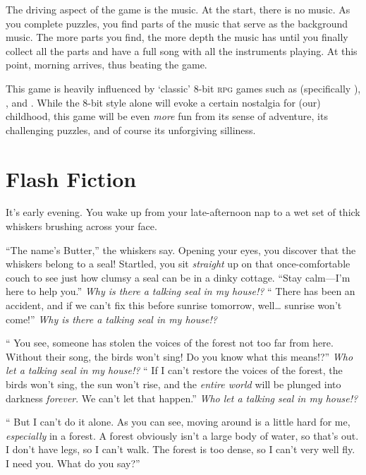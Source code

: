 \documentclass[letterpaper]{article}
\begin{document}
The driving aspect of the game is the music.
At the start, there is no music.
As you complete puzzles, you find parts of the music that serve as the background music.
The more parts you find, the more depth the music has until you finally collect all the parts and have a full song with all the instruments playing.
At this point, morning arrives, thus beating the game.

This game is heavily influenced by \enquote*{classic} 8-bit \textsc{rpg} games
  such as 
  (specifically ),
  , and
  .
While the 8-bit style alone will evoke a certain nostalgia for (our) childhood,
  this game will be even \emph{more} fun from its sense of adventure,
  its challenging puzzles, and of course
  its unforgiving silliness.

\section{Flash Fiction}
\label{sec:flash-fiction}

\def\thought{\textsl}

It's early evening.
You wake up from your late-afternoon nap to
  a wet set of thick whiskers
  brushing across your face.

\enquote{The name's Butter,} the whiskers say.
Opening your eyes, you discover that the whiskers belong to a seal!
Startled, you sit \emph{straight} up on that once-comfortable couch
  to see just how clumsy a seal can be in a dinky cottage.
\enquote{Stay calm---I'm here to help you.}
\thought{Why is there a talking seal in my house!?}
\enquote{%
  There has been an accident, and
  if we can't fix this before sunrise tomorrow, well\dots
  sunrise won't come!}
\thought{Why is there a talking seal in my house!?}

\enquote{%
  You see, someone has stolen
  the voices of the forest
  not too far from here.
  Without their song, the birds won't sing!
  Do you know what this means!?}
\thought{Who let a talking seal in my house!?}
\enquote{%
  If I can't restore the
  voices of the forest,
  the birds won't sing,
  the sun won't rise,
  and the \emph{entire world} will be
  plunged into darkness \emph{forever}.
  We can't let that happen.}
\thought{Who let a talking seal in my house!?}

\enquote{%
  But I can't do it alone.
  As you can see, moving around is a little hard for me, \emph{especially} in a forest.
  A forest obviously isn't a large body of water, so that's out.
  I don't have legs, so I can't walk.
  The forest is too dense, so I can't very well fly.
  I need you.
  What do you say?}
\end{document}
